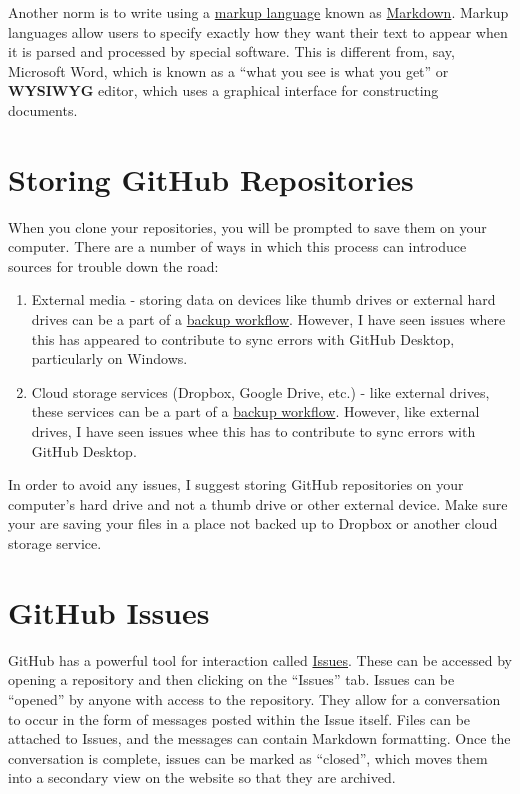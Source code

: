 \documentclass[]{book}
\providecommand{\tightlist}{%
  \setlength{\itemsep}{0pt}\setlength{\parskip}{0pt}}
\begin{document}
Another norm is to write using a
\href{https://en.wikipedia.org/wiki/Markup_language}{markup language}
known as \href{https://daringfireball.net/projects/markdown/}{Markdown}.
Markup languages allow users to specify exactly how they want their text
to appear when it is parsed and processed by special software. This is
different from, say, Microsoft Word, which is known as a ``what you see
is what you get'' or \textbf{WYSIWYG} editor, which uses a graphical
interface for constructing documents.

\section{Storing GitHub Repositories}\label{storing-github-repositories}

When you clone your repositories, you will be prompted to save them on
your computer. There are a number of ways in which this process can
introduce sources for trouble down the road:

\begin{enumerate}
\def\labelenumi{\arabic{enumi}.}
\tightlist
\item
  External media - storing data on devices like thumb drives or external
  hard drives can be a part of a \href{protecting-your-work.html}{backup
  workflow}. However, I have seen issues where this has appeared to
  contribute to sync errors with GitHub Desktop, particularly on
  Windows.
\item
  Cloud storage services (Dropbox, Google Drive, etc.) - like external
  drives, these services can be a part of a
  \href{protecting-your-work.html}{backup workflow}. However, like
  external drives, I have seen issues whee this has to contribute to
  sync errors with GitHub Desktop.
\end{enumerate}

In order to avoid any issues, I suggest storing GitHub repositories on
your computer's hard drive and not a thumb drive or other external
device. Make sure your are saving your files in a place not backed up to
Dropbox or another cloud storage service.

\section{GitHub Issues}\label{github-issues}

GitHub has a powerful tool for interaction called
\href{https://help.github.com/articles/about-issues/}{Issues}. These can
be accessed by opening a repository and then clicking on the ``Issues''
tab. Issues can be ``opened'' by anyone with access to the repository.
They allow for a conversation to occur in the form of messages posted
within the Issue itself. Files can be attached to Issues, and the
messages can contain Markdown formatting. Once the conversation is
complete, issues can be marked as ``closed'', which moves them into a
secondary view on the website so that they are archived.
\end{document}
